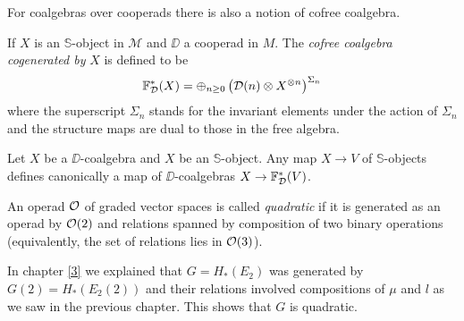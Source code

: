 \documentclass[TFM.tex]{subfiles}
\begin{document}
For coalgebras over cooperads there is also a notion of cofree coalgebra. 

\begin{defi}
If $X$ is an $\mathbb{S}$-object in $\mathscr{M}$ and $\DD$ a cooperad in $M$. The \emph{cofree coalgebra cogenerated by }$X$ is defined to be
\[
\mathbb{F}^*_{\mathcal{D}}(X)=\oplus_{n\geq 0}\left(\mathcal{D}(n)\otimes X^{\otimes n}\right)^{\Sigma_n}
\]
where the superscript $\Sigma_n$ stands for the invariant elements under the action of $\Sigma_n$ and the structure maps are dual to those in the free algebra. %
\end{defi}



Let $X$ be a $\DD$-coalgebra and $X$ be an $\mathbb{S}$-object. Any map $X\to V$ of $\mathbb{S}$-objects defines canonically a map of $\DD$-coalgebras $X\to \mathbb{F}_{\mathcal{D}}^*(V)$.  

%

\begin{defi}
An operad ${\mathcal O}$ of graded vector spaces is called \emph{quadratic} if it is generated as an operad by ${\mathcal O}(2)$ and relations spanned by composition of two binary operations (equivalently, the set of relations lies in ${\mathcal O}(3)$). 
\end{defi}

In chapter \ref{3} we explained that $G=H_*(E_2)$ was generated by $G(2)=H_*(E_2(2))$ and their relations involved compositions of $\mu$ and $l$ as we saw in the previous chapter. This shows that $G$ is quadratic. %
\end{document}

